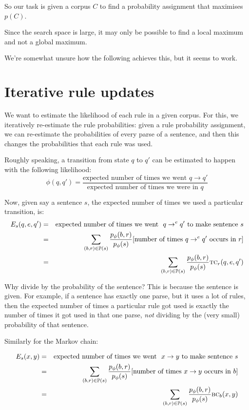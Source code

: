 \documentclass[12pt]{article}
\theoremstyle{definition}
\begin{document}
So our task is given a corpus $C$ to find a probability assignment that maximises $p(C)$. 

Since the search space is large, it may only be possible to find a local maximum and not a global maximum.

We're somewhat unsure how the following achieves this, but it seems to work.


\section{Iterative rule updates}


We want to estimate the likelihood of each rule in a given corpus. For this, we iteratively re-estimate the rule probabilities: given a rule probability assignment, we can re-estimate the probabilities of every parse of a sentence, and then this changes the probabilities that each rule was used.

Roughly speaking, a transition from state $q$ to $q'$ can be estimated to happen with the following likelihood:
$$\phi(q,q') = \frac{\textrm{expected number of times we went }q\rightarrow q'}{\textrm{expected number of times we were in }q}$$

Now, given say a sentence $s$, the expected number of times we used a particular transition, is:
\begin{eqnarray*}
  E_s(q,e,q') & = & \textrm{expected number of times we went }~q\rightarrow^eq'~\textrm{to make sentence}~s \\
  & = & \sum_{(b,r)\in\mathbb{P}(s)}\frac{p_\phi(b,r)}{p_\phi(s)}[\textrm{number of times}~q\rightarrow^eq'\textrm{ occurs in }r ] \\
  & = & \sum_{(b,r)\in\mathbb{P}(s)}\frac{p_\phi(b,r)}{p_\phi(s)}\text{\textsc{tc}}_r(q,e,q')
  \end{eqnarray*}

Why divide by the probability of the sentence? This is because the sentence is given. For example, if a sentence has exactly one parse, but it uses a lot of rules, then the expected number of times a particular rule got used is exactly the number of times it got used in that one parse, \emph{not} dividing by the (very small) probability of that sentence.

Similarly for the Markov chain:

\begin{eqnarray*}
  E_s(x,y) & = & \textrm{expected number of times we went }~x\rightarrow y~\textrm{to make sentence}~s \\
  & = & \sum_{(b,r)\in\mathbb{P}(s)}\frac{p_\phi(b,r)}{p_\phi(s)}[\textrm{number of times}~x\rightarrow y\textrm{ occurs in }b ] \\
  & = & \sum_{(b,r)\in\mathbb{P}(s)}\frac{p_\phi(b,r)}{p_\phi(s)}\text{\textsc{bc}}_b(x,y)
  \end{eqnarray*}
\end{document}
